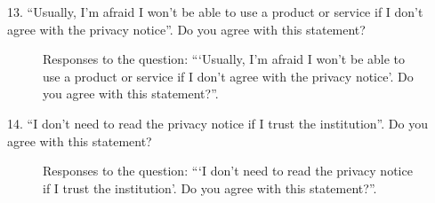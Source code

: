 13. ``Usually, I'm afraid I won't be able to use a product or service if I don't agree with the privacy notice''. Do you agree with this statement?

\begin{figure}[H]
    \begin{center}
        \caption{Responses to the question: ```Usually, I'm afraid I won't be able to use a product or service if I don't agree with the privacy notice'. Do you agree with this statement?''.}
        \label{fig:survey_s2_q13}
    \end{center}
\end{figure}

14. ``I don't need to read the privacy notice if I trust the institution''. Do you agree with this statement?

\begin{figure}[H]
    \begin{center}
        \caption{Responses to the question: ```I don't need to read the privacy notice if I trust the institution'. Do you agree with this statement?''.}
        \label{fig:survey_s2_q14}
    \end{center}
\end{figure}

